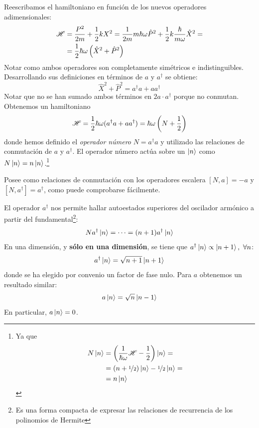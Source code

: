 Reescribamos el hamiltoniano en función de los nuevos operadores
adimensionales:
\begin{equation}
  \begin{split}
    \mathscr{H} &= \frac{P^2}{2m} + \frac{1}{2} k X^2 = \frac{1}{2m} m
    \hbar\omega \hat{P}^2 + \frac{1}{2} k \frac{\hbar}{m\omega}
    \hat{X}^2 = \\
    &= \frac{1}{2} \hbar \omega \left( \hat{X}^2 + \hat{P}^2 \right)
  \end{split}
\end{equation}
Notar como ambos operadores son completamente simétricos e
indistinguibles. Desarrollando sus definiciones en términos de $a$ y
$a^\dagger$ se obtiene:
\begin{equation}
\hat{X}^2 + \hat{P}^2 = a^\dagger a + a a^\dagger
\end{equation}
Notar que no se han sumado ambos términos en $2a\cdot a^\dagger$
porque no conmutan. Obtenemos un hamiltoniano
\begin{equation}
  \mathscr{H} = \frac{1}{2} \hbar\omega(a^\dagger a + a a^\dagger) = \hbar
  \omega \left( N + \frac{1}{2} \right)
\end{equation}
donde hemos definido el \emph{operador número} $N=a^\dagger a$ y
utilizado las relaciones de conmutación de $a$ y $a^\dagger$. El
operador número actúa sobre un $\ket{n}$ como
$N\ket{n}=n\ket{n}$.\footnote{Ya que
\begin{equation*}
  \begin{split}
    N\ket{n} &= \left( \frac{1}{\hbar \omega}\mathscr{H} - \frac{1}{2} \right)\ket{n} = \\
    &= (n+{\nicefrac{1}{2}})\ket{n} - {\nicefrac{1}{2}}\ket{n} = \\
    &= n \ket{n}
  \end{split}
\end{equation*}}

Posee como relaciones de conmutación con los operadores escalera
$[N,a]=-a$ y $[N,a^\dagger]=a^\dagger$, como puede comprobarse fácilmente.

El operador $a^\dagger$ nos permite hallar autoestados superiores del
oscilador armónico a partir del fundamental\footnote{Es una forma compacta de
expresar las relaciones de recurrencia de los polinomios de Hermite}:
\begin{equation}
  N a^\dagger\ket{n} = \cdots = (n+1) a^\dagger \ket{n}
\end{equation}
En una dimensión, y {\bfseries sólo en una dimensión}, se tiene que
$a^\dagger\ket{n}\propto \ket{n+1}, \ \forall n$:
\begin{equation}
  a^\dagger\ket{n} = \sqrt{n+1} \ket{n+1}
\end{equation}
donde se ha elegido por convenio un factor de fase
nulo. Para $a$
obtenemos un resultado similar:
\begin{equation}
  a\ket{n} = \sqrt{n}\ket{n-1}
\end{equation}
En particular, $a\ket{n}=0$.

